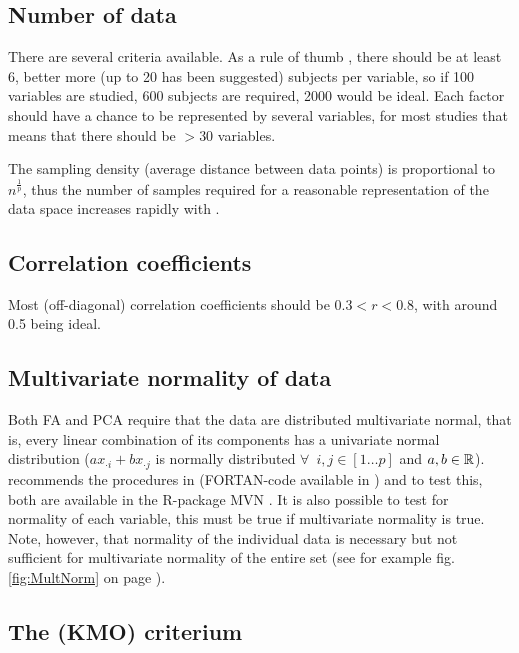 \begin{refsection}
\subsection{Number of data}

There are several criteria available. As a rule of thumb \parencite{Wil-10}, there should be at least 6, better more (up to 20 has been suggested) subjects per variable, so if 100 variables are studied, 600 subjects are required, 2000 would be ideal. Each factor should have a chance to be represented by several variables, for most studies that means that there should be \(> 30 \) variables.

The sampling density (average distance between data points) is proportional to \(n^\frac{1}{p} \), thus the number of samples  required for a reasonable representation of the data space increases rapidly with .

\subsection{Correlation coefficients}

Most (off-diagonal) correlation coefficients should be \(0.3 < r < 0.8 \), with around \num{0.5} being ideal.

\subsection{Multivariate normality of data}\label{text:MulNorm}

Both \acs{FA} and \acs{PCA} require that the data are distributed multivariate normal, that is, every linear combination of its  components has a univariate normal distribution (\( ax_{\cdot i} + bx_{\cdot j} \) is normally distributed \(\forall\enspace i,j \in [1\ldots p] \) and \(a,b \in \mathbb{R} \)). \parencite{Zyg-14} recommends the procedures in \parencite{Roy-95} (FORTAN-code available in \parencite{Mil-04}) and \parencite{Hen-90} to test this, both are available in the R-package MVN \parencite{Kor-14}. It is also possible to test for normality of each variable, this must be true if multivariate normality is true. Note, however, that normality of the individual data is necessary but not sufficient for multivariate normality of the entire set (see for example fig. \ref{fig:MultNorm} on page \pageref{fig:MultNorm}).

\subsection{The  (KMO) criterium}


\end{refsection}
